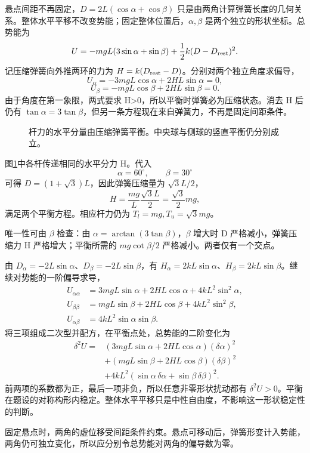 \begin{solution}
悬点间距不再固定，$D=2L(\cos\alpha+\cos\beta)$ 只是由两角计算弹簧长度的几何关系。整体水平平移不改变势能；固定整体位置后，$\alpha,\beta$ 是两个独立的形状坐标。总势能为
\[
U=-mgL(3\sin\alpha+\sin\beta)
+\frac12k(D-D_{\rm rest})^2.
\]
记压缩弹簧向外推两环的力为 $H=k(D_{\rm rest}-D)$。分别对两个独立角度求偏导，
\[
U_\alpha=-3mgL\cos\alpha+2HL\sin\alpha=0,
\]
\[
U_\beta=-mgL\cos\beta+2HL\sin\beta=0.
\]
由于角度在第一象限，两式要求 H>0，所以平衡时弹簧必为压缩状态。消去 H 后仍有 $\tan\alpha=3\tan\beta$，但另一条方程现在来自弹簧力，不再是固定间距条件。

\begin{figure}[H]\centering
{}
\caption{杆力的水平分量由压缩弹簧平衡。中央球与侧球的竖直平衡仍分别成立。}\label{deep2:fig:d2-h12-s}
\end{figure}

图\ref{deep2:fig:d2-h12-s}中各杆传递相同的水平分力 H。代入
\[
\alpha=60^\circ,\qquad\beta=30^\circ
\]
可得 $D=(1+\sqrt3)L$，因此弹簧压缩量为 $\sqrt3L/2$，
\[
H=\frac{mg}{L}\frac{\sqrt3L}{2}=\frac{\sqrt3}{2}mg,
\]
满足两个平衡方程。相应杆力仍为 $T_l=mg,T_u=\sqrt3mg$。

唯一性可由 $\beta$ 检查：由 $\alpha=\arctan(3\tan\beta)$，$\beta$ 增大时 D 严格减小，弹簧压缩力 H 严格增大；平衡所需的 $mg\cot\beta/2$ 严格减小。两者仅有一个交点。

由 $D_\alpha=-2L\sin\alpha$、$D_\beta=-2L\sin\beta$，有 $H_\alpha=2kL\sin\alpha$、$H_\beta=2kL\sin\beta$。继续对势能的一阶偏导求导，
\[
\begin{aligned}
U_{\alpha\alpha}&=3mgL\sin\alpha+2HL\cos\alpha+4kL^2\sin^2\alpha,\\
U_{\beta\beta}&=mgL\sin\beta+2HL\cos\beta+4kL^2\sin^2\beta,\\
U_{\alpha\beta}&=4kL^2\sin\alpha\sin\beta.
\end{aligned}
\]
将三项组成二次型并配方，在平衡点处，总势能的二阶变化为
\begin{align*}
\delta^2U={}&(3mgL\sin\alpha+2HL\cos\alpha)(\delta\alpha)^2\\
&+(mgL\sin\beta+2HL\cos\beta)(\delta\beta)^2\\
&+4kL^2(\sin\alpha\,\delta\alpha+\sin\beta\,\delta\beta)^2.
\end{align*}
前两项的系数都为正，最后一项非负，所以任意非零形状扰动都有 $\delta^2U>0$。平衡在题设的对称构形内稳定。整体水平平移只是中性自由度，不影响这一形状稳定性的判断。

固定悬点时，两角的虚位移受间距条件约束。悬点可移动后，弹簧形变计入势能，两角仍可独立变化，所以应分别令总势能对两角的偏导数为零。

\end{solution}

